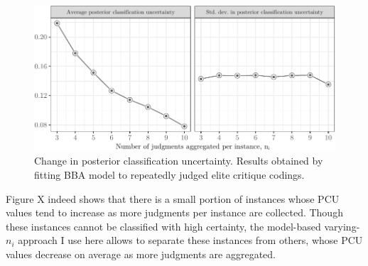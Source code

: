 \documentclass[12pt,]{article}
\begin{document}
\begin{figure}[H]

{\centering \includegraphics{licht_2019_evaluating_crowdsourced_elite_critique_codings_files/figure-latex/test_pcu_sumstats-1} 

}

\caption{Change in posterior classification uncertainty.  Results obtained by fitting BBA model to repeatedly judged elite critique codings.}\label{fig:test_pcu_sumstats}
\end{figure}

Figure X indeed shows that there is a small portion of instances whose
PCU values tend to increase as more judgments per instance are
collected. Though these instances cannot be classified with high
certainty, the model-based varying-\(n_i\) approach I use here allows to
separate these instances from others, whose PCU values decrease on
average as more judgments are aggregated.
\end{document}
